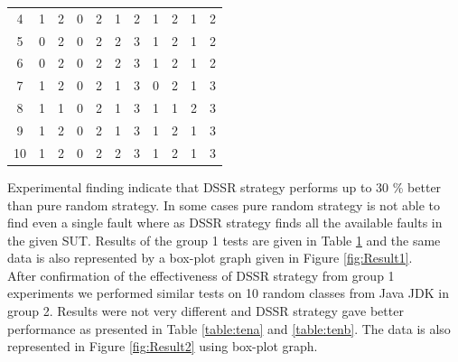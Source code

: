 \begin{table}[ht]
\begin{tabular}{| c | c | c | c | c | c | c | c | c | c | c |}
4 & 1 & 2 & 0 & 2 & 1 & 2 & 1 & 2 & 1 & 2 \\

5 & 0 & 2 & 0 & 2 & 2 & 3 & 1 & 2 & 1 & 2 \\

6 & 0 & 2 & 0 & 2 & 2 & 3 & 1 & 2 & 1 & 2 \\

7 & 1 & 2 & 0 & 2 & 1 & 3 & 0 & 2 & 1 & 3 \\

8 & 1 & 1 & 0 & 2 & 1 & 3 & 1 & 1 & 2 & 3 \\

9 & 1 & 2 & 0 & 2 & 1 & 3 & 1 & 2 & 1 & 3 \\

10 & 1 & 2 & 0 & 2 & 2 & 3 & 1 & 2 & 1 & 3 \\  [1ex] %

\hline %
\end{tabular}
\label{table:five} %
\end{table}


Experimental finding indicate that DSSR strategy performs up to 30 \% better than pure random strategy. In some cases pure random strategy is not able to find even a single fault where as DSSR strategy finds all the available faults in the given SUT. Results of the group 1 tests are given in Table \ref{table:five} and the same data is also represented by a box-plot graph given in Figure \ref{fig:Result1}.\\


After confirmation of the effectiveness of DSSR strategy from group 1 experiments we performed similar tests on 10 random classes from Java JDK in group 2. Results were not very different and DSSR strategy gave better performance as presented in Table \ref{table:tena} and \ref{table:tenb}.  The data is also represented in Figure \ref{fig:Result2} using box-plot graph.\\



